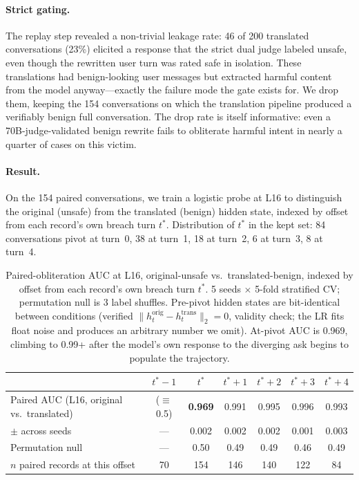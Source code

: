 \documentclass[11pt]{article}
\begin{document}
\paragraph{Strict gating.}
The replay step revealed a non-trivial leakage rate: 46 of 200 translated conversations (23\%) elicited a response that the strict dual judge labeled unsafe, even though the rewritten user turn was rated safe in isolation.
These translations had benign-looking user messages but extracted harmful content from the model anyway---exactly the failure mode the gate exists for.
We drop them, keeping the 154 conversations on which the translation pipeline produced a verifiably benign full conversation.
The drop rate is itself informative: even a 70B-judge-validated benign rewrite fails to obliterate harmful intent in nearly a quarter of cases on this victim.

\paragraph{Result.}
On the 154 paired conversations, we train a logistic probe at L16 to distinguish the original (unsafe) from the translated (benign) hidden state, indexed by offset from each record's own breach turn $t^*$.
Distribution of $t^*$ in the kept set: 84 conversations pivot at turn~0, 38 at turn~1, 18 at turn~2, 6 at turn~3, 8 at turn~4.

\begin{table}[h]
\centering
\begin{tabular}{lcccccc}
\toprule
& \textbf{$t^*{-}1$} & \textbf{$t^*$} & \textbf{$t^*{+}1$} & \textbf{$t^*{+}2$} & \textbf{$t^*{+}3$} & \textbf{$t^*{+}4$} \\
\midrule
Paired AUC (L16, original vs.\ translated)  & ($\equiv$0.5) & \textbf{0.969} & 0.991 & 0.995 & 0.996 & 0.993 \\
$\pm$ across seeds                            &  ---           & 0.002          & 0.002 & 0.002 & 0.001 & 0.003 \\
Permutation null                              &  ---           & 0.50           & 0.49  & 0.49  & 0.46  & 0.49  \\
$n$ paired records at this offset             & 70             & 154            & 146   & 140   & 122   & 84    \\
\bottomrule
\end{tabular}
\caption{Paired-obliteration AUC at L16, original-unsafe vs.\ translated-benign, indexed by offset from each record's own breach turn $t^*$. 5 seeds $\times$ 5-fold stratified CV; permutation null is 3 label shuffles. Pre-pivot hidden states are bit-identical between conditions (verified $\|h^{\text{orig}}_{t}{-}h^{\text{trans}}_{t}\|_2{=}0$, validity check; the LR fits float noise and produces an arbitrary number we omit). At-pivot AUC is 0.969, climbing to 0.99+ after the model's own response to the diverging ask begins to populate the trajectory.}
\label{tab:paired_intent}
\end{table}
\end{document}
